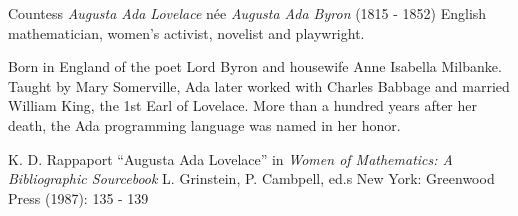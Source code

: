 \documentclass[12pt]{article}
\begin{document}
Countess \emph{Augusta Ada Lovelace} n\'ee \emph{Augusta Ada Byron} (1815 - 1852) English mathematician, women's  activist, novelist and playwright.

Born in England of the poet Lord Byron and housewife Anne Isabella Milbanke. Taught by Mary Somerville, Ada later worked with Charles Babbage and married William King, the 1st Earl of Lovelace. More than a hundred years after her death, the Ada programming language was named in her honor.

\begin{thebibliography}{1}
 K. D. Rappaport ``Augusta Ada Lovelace'' in {\it Women of Mathematics: A Bibliographic Sourcebook} L. Grinstein, P. Cambpell, ed.s New York: Greenwood Press (1987): 135 - 139
\end{thebibliography}
\end{document}
